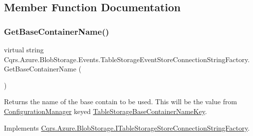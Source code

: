 \subsection{Member Function Documentation}
\mbox{\label{classCqrs_1_1Azure_1_1BlobStorage_1_1Events_1_1TableStorageEventStoreConnectionStringFactory_a118388598a7fa653122fc11521c915d7_a118388598a7fa653122fc11521c915d7}} 
\subsubsection{\texorpdfstring{Get\+Base\+Container\+Name()}{GetBaseContainerName()}}
{\footnotesize\ttfamily virtual string Cqrs.\+Azure.\+Blob\+Storage.\+Events.\+Table\+Storage\+Event\+Store\+Connection\+String\+Factory.\+Get\+Base\+Container\+Name (\begin{DoxyParamCaption}{ }\end{DoxyParamCaption})\hspace{0.3cm}{\ttfamily [virtual]}}



Returns the name of the base contain to be used. This will be the value from \hyperlink{namespaceCqrs_1_1Azure_1_1ConfigurationManager}{Configuration\+Manager} keyed \hyperlink{classCqrs_1_1Azure_1_1BlobStorage_1_1Events_1_1TableStorageEventStoreConnectionStringFactory_a9aad5e7497e3f5192d3aaec8d5f7b5f8_a9aad5e7497e3f5192d3aaec8d5f7b5f8}{Table\+Storage\+Base\+Container\+Name\+Key}. 



Implements \hyperlink{interfaceCqrs_1_1Azure_1_1BlobStorage_1_1ITableStorageStoreConnectionStringFactory_a1b9bfc9dcb7292e62619fc46e4a85982_a1b9bfc9dcb7292e62619fc46e4a85982}{Cqrs.\+Azure.\+Blob\+Storage.\+I\+Table\+Storage\+Store\+Connection\+String\+Factory}.



